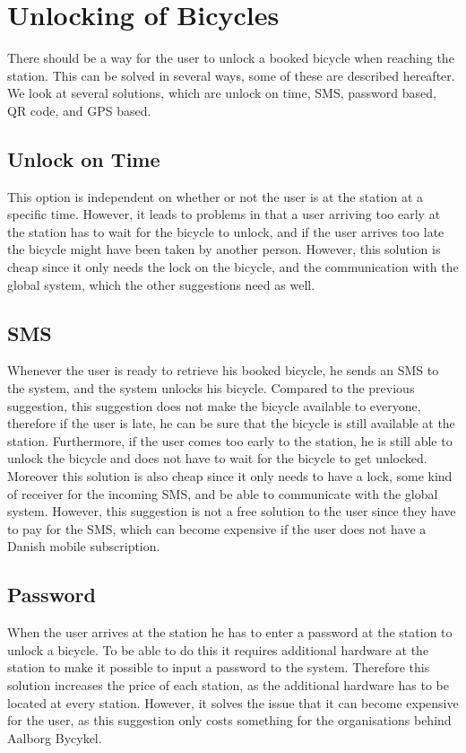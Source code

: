 \section{Unlocking of Bicycles}\label{sec:Lock}
There should be a way for the user to unlock a booked bicycle when reaching the station.
This can be solved in several ways, some of these are described hereafter.
We look at several solutions, which are unlock on time, SMS, password based, QR code, and GPS based.

\subsection{Unlock on Time}
This option is independent on whether or not the user is at the station at a specific time.
However, it leads to problems in that a user arriving too early at the station has to wait for the bicycle to unlock, and if the user arrives too late the bicycle might have been taken by another person.
However, this solution is cheap since it only needs the lock on the bicycle, and the communication with the global system, which the other suggestions need as well.

\subsection{SMS}
Whenever the user is ready to retrieve his booked bicycle, he sends an SMS to the system, and the system unlocks his bicycle.
Compared to the previous suggestion, this suggestion does not make the bicycle available to everyone, therefore if the user is late, he can be sure that the bicycle is still available at the station.
Furthermore, if the user comes too early to the station, he is still able to unlock the bicycle and does not have to wait for the bicycle to get unlocked.
Moreover this solution is also cheap since it only needs to have a lock, some kind of receiver for the incoming SMS, and be able to communicate with the global system.
However, this suggestion is not a free solution to the user since they have to pay for the SMS, which can become expensive if the user does not have a Danish mobile subscription.

\subsection{Password}
When the user arrives at the station he has to enter a password at the station to unlock a bicycle.
To be able to do this it requires additional hardware at the station to make it possible to input a password to the system.
Therefore this solution increases the price of each station, as the additional hardware has to be located at every station.
However, it solves the issue that it can become expensive for the user, as this suggestion only costs something for the organisations behind Aalborg Bycykel.

